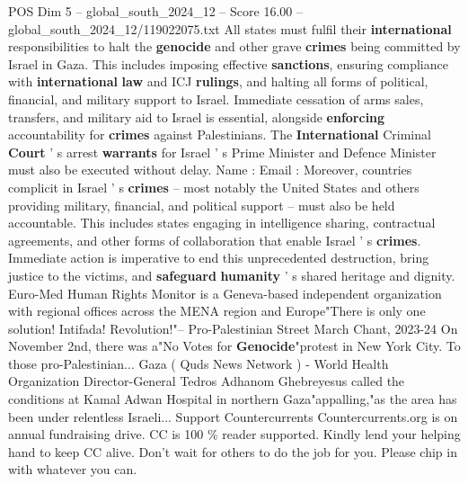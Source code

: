 \begin{textsample}{POS Dim 5 – global\_south\_2024\_12 – Score 16.00 – global\_south\_2024\_12/119022075.txt}
All states must fulfil their \textbf{international} responsibilities to halt the \textbf{genocide} and other grave \textbf{crimes} being committed by Israel in Gaza.
This includes imposing effective \textbf{sanctions}, ensuring compliance with \textbf{international} \textbf{law} and ICJ \textbf{rulings}, and halting all forms of political, financial, and military support to Israel.
Immediate cessation of arms sales, transfers, and military aid to Israel is essential, alongside \textbf{enforcing} accountability for \textbf{crimes} against Palestinians.
The \textbf{International} Criminal \textbf{Court} ' s arrest \textbf{warrants} for Israel ' s Prime Minister and Defence Minister must also be executed without delay.
Name : Email : Moreover, countries complicit in Israel ' s \textbf{crimes} -- most notably the United States and others providing military, financial, and political support -- must also be held accountable.
This includes states engaging in intelligence sharing, contractual agreements, and other forms of collaboration that enable Israel ' s \textbf{crimes}.
Immediate action is imperative to end this unprecedented destruction, bring justice to the victims, and \textbf{safeguard} \textbf{humanity} ' s shared heritage and dignity.
Euro-Med Human Rights Monitor is a Geneva-based independent organization with regional offices across the MENA region and Europe"There is only one solution!
Intifada!
Revolution!"-- Pro-Palestinian Street March Chant, 2023-24 On November 2nd, there was a"No Votes for \textbf{Genocide}"protest in New York City.
To those pro-Palestinian...
Gaza ( Quds News Network ) - World Health Organization Director-General Tedros Adhanom Ghebreyesus called the conditions at Kamal Adwan Hospital in northern Gaza"appalling,"as the area has been under relentless Israeli...
Support Countercurrents Countercurrents.org is on annual fundraising drive.
CC is 100 \% reader supported.
Kindly lend your helping hand to keep CC alive.
Don't wait for others to do the job for you.
Please chip in with whatever you can.

\end{textsample}
